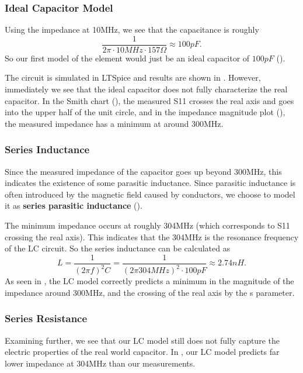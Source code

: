 \documentclass{article}
\begin{document}
\subsubsection{Ideal Capacitor Model}

Using the impedance at 10MHz, we see that the capacitance is roughly
$$\frac{1}{2\pi\cdot 10MHz \cdot 157 \Omega} \approx 100pF .$$
So our first model of the element would just be an ideal capacitor of $100pF$ ().

The circuit is simulated in LTSpice and results are shown in .
However, immediately we see that the ideal capacitor does not fully characterize the real capacitor.
In the Smith chart (), the measured S11 crosses the real axis and goes into the upper half of the unit circle, and in the impedance magnitude plot (), the measured impedance has a minimum at around 300MHz.

\subsubsection{Series Inductance}

Since the measured impedance of the capacitor goes up beyond 300MHz, this indicates the existence of some parasitic inductance.
Since parasitic inductance is often introduced by the magnetic field caused by conductors, we choose to model it as \textbf{series parasitic inductance} ().

The minimum impedance occurs at roughly 304MHz (which corresponds to S11 crossing the real axis).
This indicates that the 304MHz is the resonance frequency of the LC circuit.
So the series inductance can be calculated as
\[
    L = \frac{1}{(2\pi f)^2 C}
    = \frac{1}{(2\pi 304MHz)^2 \cdot 100pF}
    \approx
    2.74nH.
\]
As seen in , the LC model correctly predicts a minimum in the magnitude of the impedance around 300MHz, and the crossing of the real axis by the s parameter.

\subsubsection{Series Resistance}
Examining  further, we see that our LC model still does not fully capture the electric properties of the real world capacitor.
In , our LC model predicts far lower impedance at 304MHz than our measurements.
\end{document}
